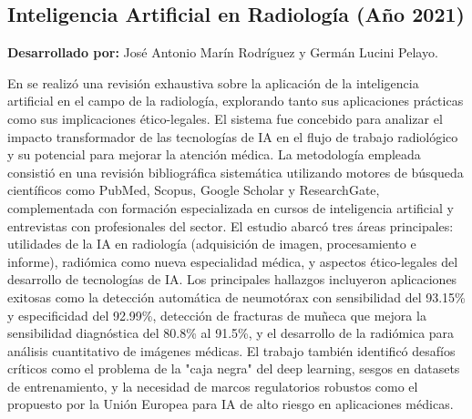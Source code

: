 {\subsection{Inteligencia Artificial en Radiología (Año 2021)}

\textbf{Desarrollado por:} José Antonio Marín Rodríguez y Germán Lucini Pelayo.

En \cite{marin2021} se realizó una revisión exhaustiva sobre la aplicación de la inteligencia artificial en el campo de la radiología, explorando tanto sus aplicaciones prácticas como sus implicaciones ético-legales. El sistema fue concebido para analizar el impacto transformador de las tecnologías de IA en el flujo de trabajo radiológico y su potencial para mejorar la atención médica. La metodología empleada consistió en una revisión bibliográfica sistemática utilizando motores de búsqueda científicos como PubMed, Scopus, Google Scholar y ResearchGate, complementada con formación especializada en cursos de inteligencia artificial y entrevistas con profesionales del sector. El estudio abarcó tres áreas principales: utilidades de la IA en radiología (adquisición de imagen, procesamiento e informe), radiómica como nueva especialidad médica, y aspectos ético-legales del desarrollo de tecnologías de IA. Los principales hallazgos incluyeron aplicaciones exitosas como la detección automática de neumotórax con sensibilidad del 93.15\% y especificidad del 92.99\%, detección de fracturas de muñeca que mejora la sensibilidad diagnóstica del 80.8\% al 91.5\%, y el desarrollo de la radiómica para análisis cuantitativo de imágenes médicas. El trabajo también identificó desafíos críticos como el problema de la "caja negra" del deep learning, sesgos en datasets de entrenamiento, y la necesidad de marcos regulatorios robustos como el propuesto por la Unión Europea para IA de alto riesgo en aplicaciones médicas.

}
